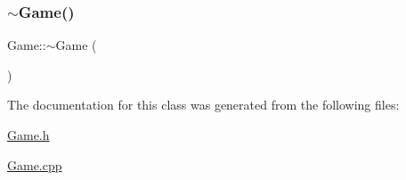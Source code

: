 \mbox{\label{classGame_ae3d112ca6e0e55150d2fdbc704474530}} 
\subsubsection{\texorpdfstring{$\sim$\+Game()}{~Game()}}
{\footnotesize\ttfamily Game\+::$\sim$\+Game (\begin{DoxyParamCaption}{ }\end{DoxyParamCaption})}



The documentation for this class was generated from the following files\+:\begin{DoxyCompactItemize}
\item 
\mbox{\hyperlink{Game_8h}{Game.\+h}}\item 
\mbox{\hyperlink{Game_8cpp}{Game.\+cpp}}\end{DoxyCompactItemize}
